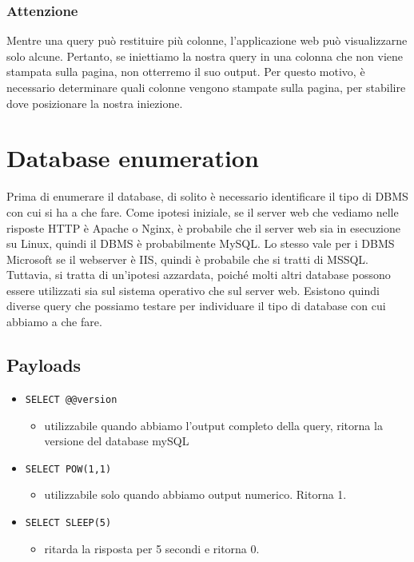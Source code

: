 \documentclass[oneside,a4paper,11pt]{book}
\theoremstyle{italicstyle}
\theoremstyle{normStyle}
\begin{document}
\subsubsection{Attenzione}
Mentre una query può restituire più colonne, l'applicazione web può visualizzarne solo alcune. Pertanto, se iniettiamo la nostra query in una colonna che non viene stampata sulla pagina, non otterremo il suo output. Per questo motivo, è necessario determinare quali colonne vengono stampate sulla pagina, per stabilire dove posizionare la nostra iniezione.

\section{Database enumeration}
Prima di enumerare il database, di solito è necessario identificare il tipo di DBMS con cui si ha a che fare. 
Come ipotesi iniziale, se il server web che vediamo nelle risposte HTTP è Apache o Nginx, è probabile che il server web sia in esecuzione su Linux, quindi il DBMS è probabilmente MySQL. Lo stesso vale per i DBMS Microsoft se il webserver è IIS, quindi è probabile che si tratti di MSSQL. Tuttavia, si tratta di un'ipotesi azzardata, poiché molti altri database possono essere utilizzati sia sul sistema operativo che sul server web. Esistono quindi diverse query che possiamo testare per individuare il tipo di database con cui abbiamo a che fare.

\subsection{Payloads}
\begin{itemize}
    \item \begin{verbatim}SELECT @@version\end{verbatim}
    \begin{itemize}
        \item utilizzabile quando abbiamo l'output completo della query, ritorna la versione del database mySQL
    \end{itemize}
    \item \begin{verbatim}SELECT POW(1,1)\end{verbatim}
    \begin{itemize}
        \item utilizzabile solo quando abbiamo output numerico. Ritorna 1.
    \end{itemize}
    \item \begin{verbatim}SELECT SLEEP(5)\end{verbatim}
    \begin{itemize}
        \item ritarda la risposta per 5 secondi e ritorna 0.
    \end{itemize}
\end{itemize}
\end{document}
